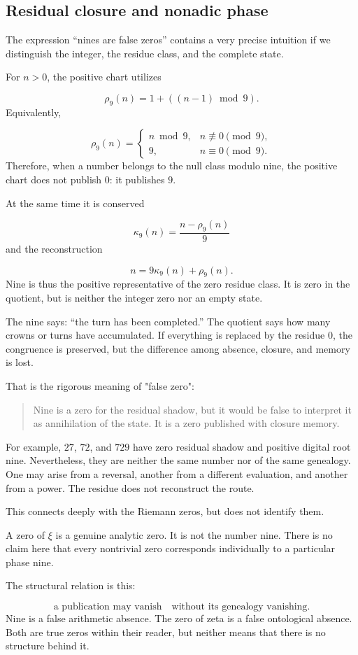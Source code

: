 \subsection{Residual closure and nonadic phase}
The expression “nines are false zeros” contains a very precise intuition if we distinguish the integer, the residue class, and the complete state.\par
For \(n>0\), the positive chart utilizes\par
\[
\rho_9(n)
=
1+((n-1)\bmod9).
\]
Equivalently,\par
\[
\rho_9(n)
=
\begin{cases}
n\bmod9,
&
n\not\equiv0\pmod9,\\[1mm]
9,
&
n\equiv0\pmod9.
\end{cases}
\]
Therefore, when a number belongs to the null class modulo nine, the positive chart does not publish \(0\): it publishes \(9\).\par
At the same time it is conserved\par
\[
\kappa_9(n)
=
\frac{n-\rho_9(n)}9
\]
and the reconstruction\par
\[
n
=
9\kappa_9(n)
+
\rho_9(n).
\]
Nine is thus the positive representative of the zero residue class. It is
zero in the quotient, but is neither the integer zero nor an empty state.\par
The nine says: “the turn has been completed.” The quotient says how many crowns or turns have accumulated. If everything is replaced by the residue \(0\), the congruence is preserved, but the difference among absence, closure, and memory is lost.\par
That is the rigorous meaning of "false zero":\par
\begin{quote}
Nine is a zero for the residual shadow, but it would be false to interpret it as annihilation of the state. It is a zero published with closure memory.\par
\end{quote}
For example, \(27\), \(72\), and \(729\) have zero residual shadow and positive digital root nine. Nevertheless, they are neither the same number nor of the same genealogy. One may arise from a reversal, another from a different evaluation, and another from a power. The residue does not reconstruct the route.\par
This connects deeply with the Riemann zeros, but does not identify them.\par
A zero of \(\xi\) is a genuine analytic zero. It is not the number nine. There is no claim here that every nontrivial zero corresponds individually to a particular phase nine.\par
The structural relation is this:\par
\[
\text{a publication may vanish}
\quad\text{without its genealogy vanishing}.
\]
Nine is a false arithmetic absence. The zero of zeta is a false ontological absence. Both are true zeros within their reader, but neither means that there is no structure behind it.\par
{}
